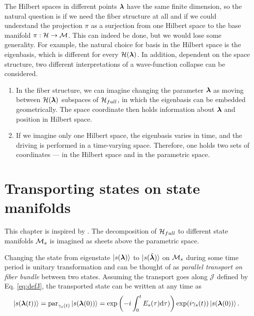 The Hilbert spaces in different points ${\bm\lambda}$ have the same finite dimension, so the natural question is if we need the fiber structure at all and if we could understand the projection $\pi$ as a surjection from one Hilbert space to the base manifold $\pi: \mathcal{H}\rightarrow \mathcal{M}$. This can indeed be done, but we would lose some generality. For example, the natural choice for basis in the Hilbert space is the eigenbasis, which is different for every $\mathcal{H}({\bm\lambda})$. In addition, dependent on the space structure, two different interpretations of a wave-function collapse can be considered.
\begin{enumerate}
    \item In the fiber structure, we can imagine changing the parameter ${\bm\lambda}$ as moving between $\mathcal{H}({\bm\lambda})$ subspaces of $\mathcal{H}_{full}$, in which the eigenbasis can be embedded geometrically. The space coordinate then holds information about ${\bm\lambda}$ and position in Hilbert space. 
    \item If we imagine only one Hilbert space, the eigenbasis varies in time, and the driving is performed in a time-varying space. Therefore, one holds two sets of coordinates — in the Hilbert space and in the parametric space.
\end{enumerate}







\section{Transporting states on state manifolds}
This chapter is inspired by \citet{berry1984}. The decomposition of $\mathcal{H}_{full}$ to different state manifolds $\mathcal{M}_s$ is imagined as sheets above the parametric space. 


Changing the state from eigenstate $\ket{s({\bm\lambda})}$ to $\ket{s(\tilde{{\bm\lambda}})}$ on $\mathcal{M}_s$ during some time period is unitary transformation and can be thought of as \emph{parallel transport on fiber bundle} between two states. Assuming the transport goes along $\mathcal J$ defined by Eq. \ref{eq:defJ}, the transported state can be written at any time as
\begin{equation}
    \hspace{-5pt}\ket{s({\bm\lambda}(t))} = \textrm{par}_{\gamma_s(t)}\ket{s({\bm\lambda}(0))} = \exp\left(-i\int_0^tE_s(\tau)\mathrm{d}\tau)\right)\exp(i\gamma_s(t))\ket{s({\bm\lambda}(0))}.
    \label{eq:phasesOnManifold}
\end{equation}


